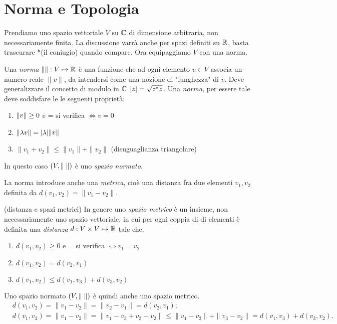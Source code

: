 \chapter{Norma e Topologia}
Prendiamo uno spazio vettoriale $V$ su $\mathbb C$ di dimensione arbitraria, non
necessariamente finita. La discussione varrà anche per spazi definiti su
$\mathbb R$, basta trascurare *(il coniugio) quando compare. Ora equipaggiamo $V$
con una norma.
\begin{definition}
Una \emph{norma} $\| \|: V \mapsto \mathbb R$ è una funzione che ad ogni elemento
$v \in V$ associa un numero reale $\|v\|$, da intendersi come una nozione di
"lunghezza" di $v$. Deve generalizzare il concetto di modulo in $\mathbb C$ 
${\left|z\right|} = \sqrt{z^* z}$. Una \emph{norma}, per essere tale deve soddisfare le
le seguenti proprietà:
\begin{enumerate}[1)]
	\item ${\|v\|} \geq 0$ e = si verifica $\iff v = 0$
	\item ${\|\lambda v\|} = {\left|\lambda\right|} {\|v\|}$
	\item $\|v_1 + v_2\| \leq \|v_1\| + \|v_2\|$ (disuguaglianza triangolare)
\end{enumerate}
In questo caso $\left(V, {\|\;\|} \right)$ è uno \emph{spazio normato}.
\end{definition}
La norma introduce anche una \emph{metrica}, cioè una distanza fra due elementi
$v_1, v_2$ definita da $d(v_1, v_2) = \|v_1 - v_2\|$. 
\begin{definition}{(distanza e spazi metrici)}
In genere uno \emph{spazio metrico} è un insieme, non necessariamente uno
spazio vettoriale, in cui per ogni coppia di di elementi è definita una
\emph{distanza} $d: V \times V \mapsto \mathbb R$ tale che:
\begin{enumerate}[1)]
	\item $d(v_1, v_2) \geq 0$ e = si verifica $\iff v_1 = v_2$
	\item $d(v_1, v_2) = d(v_2, v_1)$
	\item $d(v_1, v_2) \leq d(v_1, v_3) + d(v_3, v_2)$
\end{enumerate}
\end{definition}
Uno spazio normato $\left(V, {\|\;\|} \right)$ è quindi anche uno spazio metrico.
\begin{align*}
	&d(v_1, v_2) = \|v_1 - v_2\| = \|v_2 - v_1\| = d(v_2, v_1) ;\\ 
	&d(v_1, v_2) = \|v_1 - v_2\| = \|v_1 - v_3 +v_3 -v_2 \| \leq
	\|v_1 - v_3\| + \|v_3 - v_2\| = d(v_1, v_3) + d(v_3, v_2).
\end{align*}
